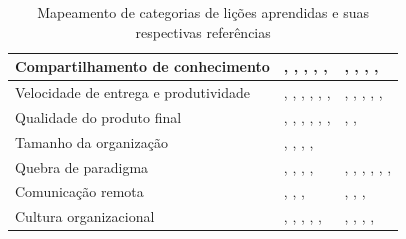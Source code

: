 \begin{table}[H]
\begin{tabularx}{\linewidth}{ | p{6cm} | X | X | }
		\hline 
		Compartilhamento de conhecimento & \cite{Asnawi2012}, \cite{Cisco2011}, \cite{Lapham2012}, \cite{Radha2012}, \cite{Eunha2012}, \cite{Ericsson2013} & \cite{Valerio2013}, \cite{Vieira2013}, \cite{Queiroz2013}, \cite{Bastos2013}, \cite{Maciel2013} \\ 
		\hline 
		Velocidade de entrega e produtividade & \cite{Adobe2012}, \cite{Fitzgerald2013}, \cite{Microsoft2013}, \cite{Cisco2011}, \cite{Korhonen2010}, \cite{Eunha2012}, \cite{Claudia2013} & \cite{Stefano2013}, \cite{Queiroz2013}, \cite{Maciel2013}, \cite{Hui2013}, \cite{Ahmed2008}, \cite{Piegas2012} \\ 
		\hline 
		Qualidade do produto final & \cite{Adobe2012}, \cite{Fitzgerald2013}, \cite{Bustard2013}, \cite{Lapham2012}, \cite{Eunha2012}, \cite{Claudia2013}, \cite{Korhonen2010} & \cite{Parzinello2012}, \cite{Maciel2013}, \cite{Ahmed2008} \\ 
		\hline 
		Tamanho da organização & \cite{Bustard2013}, \cite{Microsoft2013}, \cite{Claudia2013}, \cite{Korhonen2010}, \cite{Ericsson2013} & \cite{Maciel2013} \\ 
		\hline 
		Quebra de paradigma & \cite{Hajjdiab2011}, \cite{Block2011}, \cite{Korhonen2010}, \cite{Lapham2012}, \cite{Arikpo2011} & \cite{Stefano2013}, \cite{Bastos2013}, \cite{Maciel2013}, \cite{Parzinello2012}, \cite{Hui2013}, \cite{Ahmed2008}, \cite{Sahota2012} \\ 
		\hline 
		Comunicação remota & \cite{Adobe2012}, \cite{Microsoft2013}, \cite{Korhonen2010}, \cite{Radha2012} & \cite{Rodrigues2013}, \cite{Vieira2013}, \cite{Bastos2013}, \cite{Maciel2013} \\ 
		\hline 
		Cultura organizacional & \cite{Bustard2013}, \cite{Microsoft2013}, \cite{Claudia2013}, \cite{Nokia2013}, \cite{Eunha2012}, \cite{Fitzgerald2013} & \cite{Rodrigues2013}, \cite{Bastos2013}, \cite{Srinath2012}, \cite{Maciel2013}, \cite{Sahota2012} \\ 
		\hline 
	\end{tabularx}
	\caption{Mapeamento de categorias de lições aprendidas e suas respectivas referências}
	\label{tab:mapeamentoCategorias}
\end{table}


